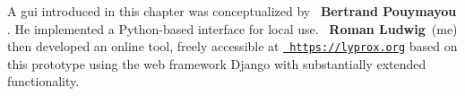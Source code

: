 \begin{tcolorbox}[
    title=\faIcon{users} Contributions,
    parbox=false,
    float
]
    A \acrlong{gui} introduced in this chapter was conceptualized by ~\textbf{Bertrand Pouymayou} \cite{pouymayou_analysis_2019}. He implemented a Python-based interface for local use. ~\textbf{Roman Ludwig}~(me) then developed an online tool, freely accessible at \href{https://lyprox.org}{~\texttt{https://lyprox.org}} based on this prototype using the web framework Django \cite{noauthor_django_2022} with substantially extended functionality.
\end{tcolorbox}
